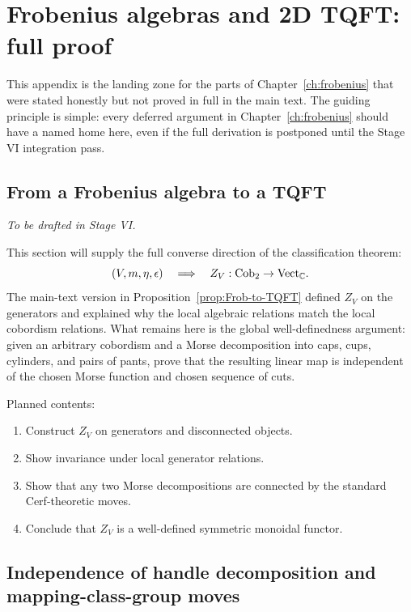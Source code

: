 \chapter{Frobenius algebras and 2D TQFT: full proof}\label{app:frobenius}

This appendix is the landing zone for the parts of Chapter~\ref{ch:frobenius} that were stated honestly but not proved in full in the main text. The guiding principle is simple: every deferred argument in Chapter~\ref{ch:frobenius} should have a named home here, even if the full derivation is postponed until the Stage VI integration pass.

\section{From a Frobenius algebra to a TQFT}\label{appsec:frob-to-tqft}

\emph{To be drafted in Stage VI.}

This section will supply the full converse direction of the classification theorem:
\begin{equation*}
(V,m,\eta,\epsilon)
\quad\Longrightarrow\quad
Z_V : \mathrm{Cob}_2 \to \mathrm{Vect}_{\mathbb{C}}.
\end{equation*}
The main-text version in Proposition~\ref{prop:Frob-to-TQFT} defined $Z_V$ on the generators and explained why the local algebraic relations match the local cobordism relations. What remains here is the global well-definedness argument: given an arbitrary cobordism and a Morse decomposition into caps, cups, cylinders, and pairs of pants, prove that the resulting linear map is independent of the chosen Morse function and chosen sequence of cuts.

\medskip

\noindent Planned contents:
\begin{enumerate}
\item Construct $Z_V$ on generators and disconnected objects.
\item Show invariance under local generator relations.
\item Show that any two Morse decompositions are connected by the standard Cerf-theoretic moves.
\item Conclude that $Z_V$ is a well-defined symmetric monoidal functor.
\end{enumerate}

\section{Independence of handle decomposition and mapping-class-group moves}\label{appsec:mapping-class}

